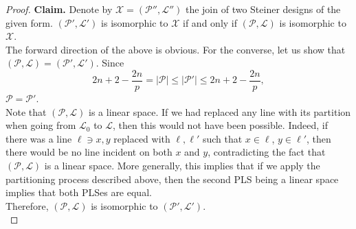 \begin{proof}
		\textbf{Claim.} Denote by $\mathcal{X} = (\mathcal{P}'',\mathcal{L}'')$ the join of two Steiner designs of the given form. $(\mathcal{P}',\mathcal{L}')$ is isomorphic to $\mathcal{X}$ if and only if $(\mathcal{P},\mathcal{L})$ is isomorphic to $\mathcal{X}$.\\
		The forward direction of the above is obvious. For the converse, let us show that $(\mathcal{P},\mathcal{L}) = (\mathcal{P}',\mathcal{L}')$. Since
		\[ 2n + 2 - \frac{2n}{p} = |\mathcal{P}| \le |\mathcal{P'}| \le 2n + 2 - \frac{2n}{p}, \]
		$\mathcal{P} = \mathcal{P}'$.\\
		Note that $(\mathcal{P},\mathcal{L})$ is a linear space. If we had replaced any line with its partition when going from $\mathcal{L}_0$ to $\mathcal{L}$, then this would not have been possible. Indeed, if there was a line $\ell \ni x,y$ replaced with $\ell,\ell'$ such that $x \in \ell$, $y \in \ell'$, then there would be no line incident on both $x$ and $y$, contradicting the fact that $(\mathcal{P},\mathcal{L})$ is a linear space. More generally, this implies that if we apply the partitioning process described above, then the second PLS being a linear space implies that both PLSes are equal. \\
		Therefore, $(\mathcal{P},\mathcal{L})$ is isomorphic to $(\mathcal{P}',\mathcal{L}')$. \qedwhite \\


\end{proof}
